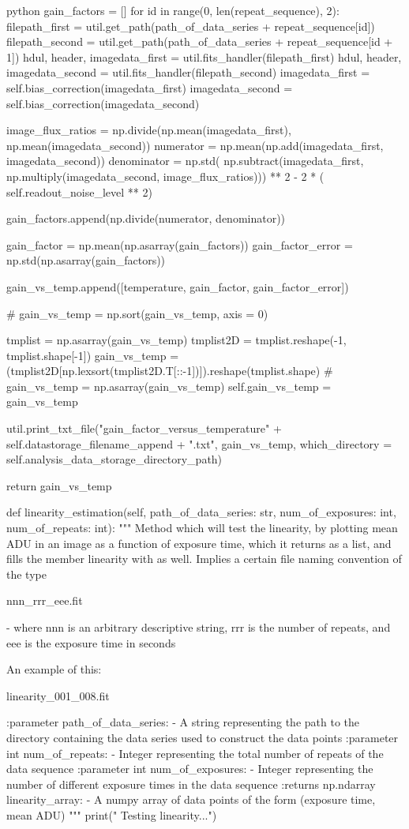 \documentclass[../main.tex]{subfiles}
\begin{document}
\begin{mintedbox}{python}
gain_factors  =  []
for id in range(0, len(repeat_sequence), 2):
filepath_first  =  util.get_path(path_of_data_series + repeat_sequence[id])
filepath_second  =  util.get_path(path_of_data_series + repeat_sequence[id + 1])
hdul, header, imagedata_first  =  util.fits_handler(filepath_first)
hdul, header, imagedata_second  =  util.fits_handler(filepath_second)
imagedata_first  =  self.bias_correction(imagedata_first)
imagedata_second  =  self.bias_correction(imagedata_second)

image_flux_ratios  =  np.divide(np.mean(imagedata_first), np.mean(imagedata_second))
numerator  =  np.mean(np.add(imagedata_first, imagedata_second))
denominator  =  np.std(
np.subtract(imagedata_first, np.multiply(imagedata_second, image_flux_ratios))) ** 2 - 2 * (
self.readout_noise_level ** 2)

gain_factors.append(np.divide(numerator, denominator))

gain_factor  =  np.mean(np.asarray(gain_factors))
gain_factor_error  =  np.std(np.asarray(gain_factors))

gain_vs_temp.append([temperature, gain_factor, gain_factor_error])

# gain_vs_temp  =  np.sort(gain_vs_temp, axis = 0)

tmplist  =  np.asarray(gain_vs_temp)
tmplist2D  =  tmplist.reshape(-1, tmplist.shape[-1])
gain_vs_temp  =  (tmplist2D[np.lexsort(tmplist2D.T[::-1])]).reshape(tmplist.shape)
# gain_vs_temp  =  np.asarray(gain_vs_temp)
self.gain_vs_temp  =  gain_vs_temp

util.print_txt_file("gain_factor_versus_temperature" + self.datastorage_filename_append + ".txt",
gain_vs_temp,
which_directory = self.analysis_data_storage_directory_path)

return gain_vs_temp

def linearity_estimation(self, path_of_data_series: str, num_of_exposures: int, num_of_repeats: int):
"""
Method which will test the linearity, by plotting mean ADU in an image
as a function of exposure time, which it returns as a list,
and fills the member linearity with as well. Implies a certain
file naming convention of the type

nnn_rrr_eee.fit

- where nnn is an arbitrary descriptive string, rrr
is the number of repeats, and eee is the exposure
time in seconds

An example of this:

linearity_001_008.fit

:parameter path_of_data_series:
- A string representing the path to the directory
containing the data series used to construct the data points
:parameter int num_of_repeats:
- Integer representing the total number of repeats of the data sequence
:parameter int num_of_exposures:
- Integer representing the number of different exposure times
in the data sequence
:returns np.ndarray linearity_array:
- A numpy array of data points of the form (exposure time, mean ADU)
"""
print(" Testing linearity...")


\end{mintedbox}
\end{document}
